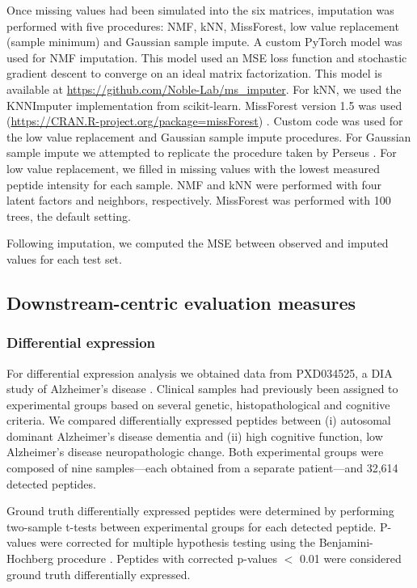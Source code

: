 \documentclass{article}
\begin{document}
Once missing values had been simulated into the six matrices, imputation was performed with five procedures: NMF, kNN, MissForest, low value replacement (sample minimum) and Gaussian sample impute. A custom PyTorch model was used for NMF imputation. This model used an MSE loss function and stochastic gradient descent to converge on an ideal matrix factorization. This model is available at \url{https://github.com/Noble-Lab/ms_imputer}. For kNN, we used the KNNImputer implementation from scikit-learn. MissForest version 1.5 was used (\url{https://CRAN.R-project.org/package=missForest}) \cite{missForest}. Custom code was used for the low value replacement and Gaussian sample impute procedures. For Gaussian sample impute we attempted to replicate the procedure taken by Perseus \cite{Perseus}. For low value replacement, we filled in missing values with the lowest measured peptide intensity for each sample. NMF and kNN were performed with four latent factors and neighbors, respectively. MissForest was performed with 100 trees, the default setting.

Following imputation, we computed the MSE between observed and imputed values for each test set.

\subsection{Downstream-centric evaluation measures}

\subsubsection{Differential expression}

For differential expression analysis we obtained data from PXD034525, a DIA study of Alzheimer's disease \cite{smtg-maccoss}. Clinical samples had previously been assigned to experimental groups based on several genetic, histopathological and cognitive criteria. We compared differentially expressed peptides between (i) autosomal dominant Alzheimer's disease dementia and (ii) high cognitive function, low Alzheimer's disease neuropathologic change. Both experimental groups were composed of nine samples---each obtained from a separate patient---and 32,614 detected peptides. 

Ground truth differentially expressed peptides were determined by performing two-sample t-tests between experimental groups for each detected peptide. P-values were corrected for multiple hypothesis testing using the Benjamini-Hochberg procedure \cite{bj-fdr}. Peptides with corrected p-values $<$ 0.01 were considered ground truth differentially expressed.
\end{document}
